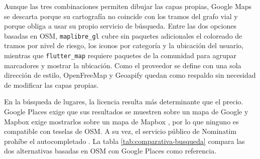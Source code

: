Aunque las tres combinaciones permiten dibujar las capas propias, Google Maps se descarta porque su cartografía no coincide con los tramos del grafo vial y porque obliga a usar su propio servicio de búsqueda. Entre las dos opciones basadas en OSM, \texttt{maplibre\_gl} cubre sin paquetes adicionales el coloreado de tramos por nivel de riesgo, los iconos por categoría y la ubicación del usuario, mientras que \texttt{flutter\_map} requiere paquetes de la comunidad para agrupar marcadores y mostrar la ubicación. Como el proveedor se define con una sola dirección de estilo, OpenFreeMap y Geoapify quedan como respaldo sin necesidad de modificar las capas propias.

En la búsqueda de lugares, la licencia resulta más determinante que el precio. Google Places exige que sus resultados se muestren sobre un mapa de Google \cite{google_places_policies} y Mapbox exige mostrarlos sobre un mapa de Mapbox \cite{mapbox_search_terms}, por lo que ninguno es compatible con teselas de OSM. A su vez, el servicio público de Nominatim prohíbe el autocompletado \cite{nominatim_policy}. La tabla \ref{tab:comparativa-busqueda} compara las dos alternativas basadas en OSM con Google Places como referencia.


